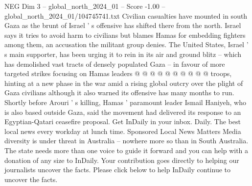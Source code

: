 \begin{textsample}{NEG Dim 3 – global\_north\_2024\_01 – Score -1.00 – global\_north\_2024\_01/104745741.txt}
Civilian casualties have mounted in south Gaza as the brunt of Israel ' s offensive has shifted there from the north.
Israel says it tries to avoid harm to civilians but blames Hamas for embedding fighters among them, an accusation the militant group denies.
The United States, Israel ' s main supporter, has been urging it to rein in its air and ground blitz -- which has demolished vast tracts of densely populated Gaza -- in favour of more targeted strikes focusing on Hamas leaders @ @ @ @ @ @ @ @ @ @ troops, hinting at a new phase in the war amid a rising global outcry over the plight of Gaza civilians although it also warned its offensive has many months to run.
Shortly before Arouri ' s killing, Hamas ' paramount leader Ismail Haniyeh, who is also based outside Gaza, said the movement had delivered its response to an Egyptian-Qatari ceasefire proposal.
Get InDaily in your inbox.
Daily.
The best local news every workday at lunch time.
Sponsored Local News Matters Media diversity is under threat in Australia -- nowhere more so than in South Australia.
The state needs more than one voice to guide it forward and you can help with a donation of any size to InDaily.
Your contribution goes directly to helping our journalists uncover the facts.
Please click below to help InDaily continue to uncover the facts.

\end{textsample}
